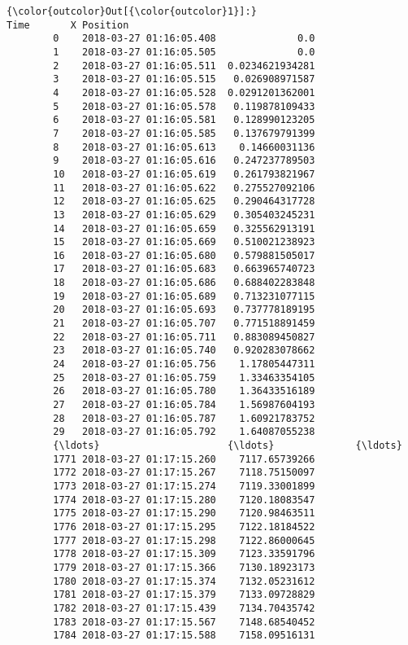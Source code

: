 \documentclass[11pt]{article}
\begin{document}
\begin{Verbatim}[commandchars=\\\{\}]
{\color{outcolor}Out[{\color{outcolor}1}]:}                         Time       X Position
        0    2018-03-27 01:16:05.408              0.0
        1    2018-03-27 01:16:05.505              0.0
        2    2018-03-27 01:16:05.511  0.0234621934281
        3    2018-03-27 01:16:05.515   0.026908971587
        4    2018-03-27 01:16:05.528  0.0291201362001
        5    2018-03-27 01:16:05.578   0.119878109433
        6    2018-03-27 01:16:05.581   0.128990123205
        7    2018-03-27 01:16:05.585   0.137679791399
        8    2018-03-27 01:16:05.613    0.14660031136
        9    2018-03-27 01:16:05.616   0.247237789503
        10   2018-03-27 01:16:05.619   0.261793821967
        11   2018-03-27 01:16:05.622   0.275527092106
        12   2018-03-27 01:16:05.625   0.290464317728
        13   2018-03-27 01:16:05.629   0.305403245231
        14   2018-03-27 01:16:05.659   0.325562913191
        15   2018-03-27 01:16:05.669   0.510021238923
        16   2018-03-27 01:16:05.680   0.579881505017
        17   2018-03-27 01:16:05.683   0.663965740723
        18   2018-03-27 01:16:05.686   0.688402283848
        19   2018-03-27 01:16:05.689   0.713231077115
        20   2018-03-27 01:16:05.693   0.737778189195
        21   2018-03-27 01:16:05.707   0.771518891459
        22   2018-03-27 01:16:05.711   0.883089450827
        23   2018-03-27 01:16:05.740   0.920283078662
        24   2018-03-27 01:16:05.756    1.17805447311
        25   2018-03-27 01:16:05.759    1.33463354105
        26   2018-03-27 01:16:05.780    1.36433516189
        27   2018-03-27 01:16:05.784    1.56987604193
        28   2018-03-27 01:16:05.787    1.60921783752
        29   2018-03-27 01:16:05.792    1.64087055238
        {\ldots}                      {\ldots}              {\ldots}
        1771 2018-03-27 01:17:15.260    7117.65739266
        1772 2018-03-27 01:17:15.267    7118.75150097
        1773 2018-03-27 01:17:15.274    7119.33001899
        1774 2018-03-27 01:17:15.280    7120.18083547
        1775 2018-03-27 01:17:15.290    7120.98463511
        1776 2018-03-27 01:17:15.295    7122.18184522
        1777 2018-03-27 01:17:15.298    7122.86000645
        1778 2018-03-27 01:17:15.309    7123.33591796
        1779 2018-03-27 01:17:15.366    7130.18923173
        1780 2018-03-27 01:17:15.374    7132.05231612
        1781 2018-03-27 01:17:15.379    7133.09728829
        1782 2018-03-27 01:17:15.439    7134.70435742
        1783 2018-03-27 01:17:15.567    7148.68540452
        1784 2018-03-27 01:17:15.588    7158.09516131

\end{Verbatim}
\end{document}
